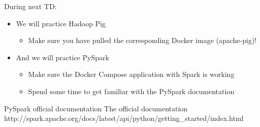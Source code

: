 \documentclass{beamer}[10pt, usepdftitle=false handout]
\begin{document}
\begin{frame}

During next TD:

\begin{itemize}
	\item{We will practice Hadoop Pig
		\begin{itemize}
			\item{Make sure you have pulled the corresponding Docker image (apache-pig)!}
		\end{itemize}			
	}
	\item{And we will practice PySpark 
		\begin{itemize}
			\item{Make sure the Docker Compose application with Spark is working}
			\item{Spend some time to get familiar with the PySpark documentation}
		\end{itemize}		
	}
\end{itemize}

\begin{block}{PySpark official documentation}
The official documentation http://spark.apache.org/docs/latest/api/python/getting\_started/index.html
\end{block}

\end{frame}
\end{document}

